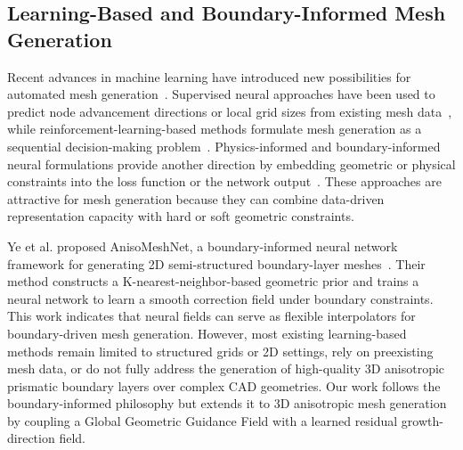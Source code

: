 \documentclass[%
 aip,
 amsmath,amssymb,
 reprint,%
nobibnotes,
]{revtex4-1}
\begin{document}
\subsection{\label{sec:rw_learning_mesh}Learning-Based and Boundary-Informed Mesh Generation}
Recent advances in machine learning have introduced new possibilities for automated mesh generation~\cite{lei2024survey}. Supervised neural approaches have been used to predict node advancement directions or local grid sizes from existing mesh data~\cite{lu2022ann}, while reinforcement-learning-based methods formulate mesh generation as a sequential decision-making problem~\cite{kino2022drl}. Physics-informed and boundary-informed neural formulations provide another direction by embedding geometric or physical constraints into the loss function or the network output~\cite{raissi2019pinn,sun2020physicsconstrained}. These approaches are attractive for mesh generation because they can combine data-driven representation capacity with hard or soft geometric constraints.

Ye et al. proposed AnisoMeshNet, a boundary-informed neural network framework for generating 2D semi-structured boundary-layer meshes~\cite{anisoMeshNet}. Their method constructs a K-nearest-neighbor-based geometric prior and trains a neural network to learn a smooth correction field under boundary constraints. This work indicates that neural fields can serve as flexible interpolators for boundary-driven mesh generation. However, most existing learning-based methods remain limited to structured grids or 2D settings, rely on preexisting mesh data, or do not fully address the generation of high-quality 3D anisotropic prismatic boundary layers over complex CAD geometries. Our work follows the boundary-informed philosophy but extends it to 3D anisotropic mesh generation by coupling a Global Geometric Guidance Field with a learned residual growth-direction field.
\end{document}
